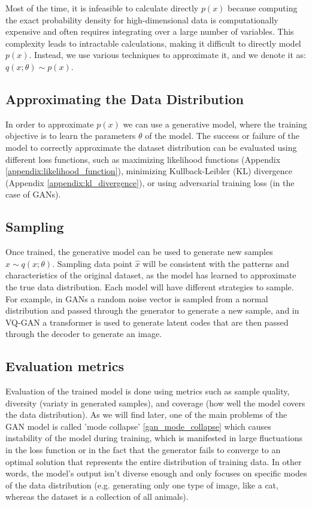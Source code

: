 Most of the time, it is infeasible to calculate directly $p(x)$ because computing the exact probability density for high-dimensional data is computationally expensive and often requires integrating over a large number of variables. This complexity leads to intractable calculations, making it difficult to directly model $p(x)$. Instead, we use various techniques to approximate it, and we denote it as: $q(x;\theta) \sim p(x)$.

\subsection{Approximating the Data Distribution}

In order to approximate $p(x)$ we can use a generative model, where the training objective is to learn the parameters $\theta$ of the model. The success or failure of the model to correctly approximate the dataset distribution can be evaluated using different loss functions, such as maximizing likelihood functions (Appendix \ref{appendix:likelihood_function}), minimizing Kullback-Leibler (KL) divergence (Appendix \ref{appendix:kl_divergence}), or using adversarial training loss (in the case of GANs).

\subsection{Sampling}

Once trained, the generative model can be used to generate new samples $\hat{x} \sim q(x;\theta)$. Sampling data point $\hat{x}$ will be consistent with the patterns and characteristics of the original dataset, as the model has learned to approximate the true data distribution. Each model will have different strategies to sample. For example, in GANs a random noise vector is sampled from a normal distribution and passed through the generator to generate a new sample, and in VQ-GAN a transformer is used to generate latent codes that are then passed through the decoder to generate an image.

\subsection{Evaluation metrics}

Evaluation of the trained model is done using metrics such as sample quality, diversity (variaty in generated samples), and coverage (how well the model covers the data distribution). As we will find later, one of the main problems of the GAN model is called 'mode collapse' \ref{gan_mode_collapse} which causes instability of the model during training, which is manifested in large fluctuations in the loss function or in the fact that the generator fails to converge to an optimal solution that represents the entire distribution of training data. In other words, the model's output isn't diverse enough and only focuses on specific modes of the data distribution (e.g. generating only one type of image, like a cat, whereas the dataset is a collection of all animals).





